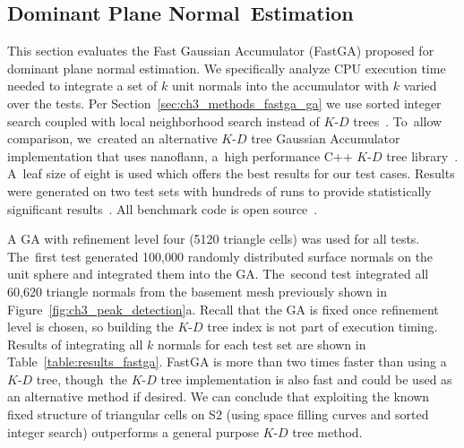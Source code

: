 \subsection{Dominant Plane Normal~Estimation}\label{sec:ch3_results_dominant}

This section evaluates the Fast Gaussian Accumulator (FastGA) proposed for dominant plane normal estimation. We specifically analyze CPU execution time needed to integrate a set of $k$ unit normals into the accumulator with $k$ varied over the tests. Per Section~\ref{sec:ch3_methods_fastga_ga} we use sorted integer search coupled with local neighborhood search instead of $K$-$D$ trees~\cite{toony_describing_2015}. To~allow comparison, we~created an alternative $K$-$D$ tree Gaussian Accumulator implementation that uses nanoflann, a~high performance C++ $K$-$D$ tree library~\cite{blanco_nanoflann_2014}. A~leaf size of eight is used which offers the best results for our test cases.  Results were generated on two test sets with hundreds of runs to provide statistically significant results~\cite{noauthor_github_2020-8}. All benchmark code is open source~\cite{Castagno_Github_fastga}. 

A GA with refinement level four (5120 triangle cells) was used for all tests. The~first test generated 100,000 randomly distributed surface normals on the unit sphere and integrated them into the GA. The~second test integrated all 60,620 triangle normals from the basement mesh previously shown in Figure~\ref{fig:ch3_peak_detection}a. Recall that the GA is fixed once refinement level is chosen, so building the $K$-$D$ tree index is not part of execution timing. Results of integrating all $k$ normals for each test set are shown in Table~\ref{table:results_fastga}. FastGA is more than two times faster than using a $K$-$D$ tree, though~the $K$-$D$ tree implementation is also fast and could be used as an alternative method if desired.  We can conclude that exploiting the known fixed structure of triangular cells on S2 (using space filling curves and sorted integer search) outperforms a general purpose $K$-$D$ tree method. 


